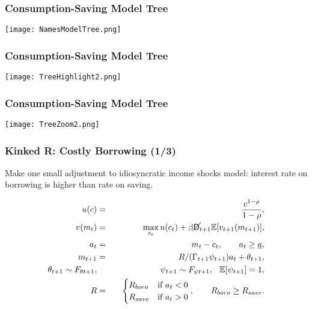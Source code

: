 \documentclass[11pt,handout]{beamer}
\newcommand{\E}{\mathbb{E}}
\newcommand{\Die}{\mathsf{D}}
\newcommand{\Live}{\cancel{\Die}}
\begin{document}
\begin{frame}
\frametitle{Consumption-Saving Model Tree}
\begin{center}
\texttt{[image: NamesModelTree.png]}
\end{center}
\end{frame}



\begin{frame}
\frametitle{Consumption-Saving Model Tree}
\begin{center}
\texttt{[image: TreeHighlight2.png]}
\end{center}
\end{frame}

\begin{frame}
\frametitle{Consumption-Saving Model Tree}
\begin{center}
\texttt{[image: TreeZoom2.png]}
\end{center}
\end{frame}


\begin{frame}
\frametitle{Kinked R: Costly Borrowing (1/3)}
Make one small adjustment to idiosyncratic income shocks model: interest rate on borrowing is higher than rate on saving.

\begin{eqnarray*}
u(c) &=& \frac{c^{1-\rho}}{1-\rho}, \\
v(m_t) &=& \max_{c_t} u(c_t) + \beta \Live_{t+1} \E [v_{t+1}(m_{t+1}) ], \\
a_t &=& m_t - c_t, \qquad a_t \geq \underline{a}, \\
m_{t+1} &=& R/(\Gamma_{t+1} \psi_{t+1}) a_t + \theta_{t+1}, \\
\theta_{t+1} \sim F_{\theta t+1}, &\qquad& \psi_{t+1} \sim F_{\psi t+1}, \hspace{0.25cm} \E[\psi_{t+1}] = 1, \\
R &=& \begin{cases}
R_{boro} & \text{if  } a_t < 0 \\
R_{save} & \text{if  } a_t > 0
\end{cases}, \qquad R_{boro} \geq R_{save}.
\end{eqnarray*}
\end{frame}
\end{document}
